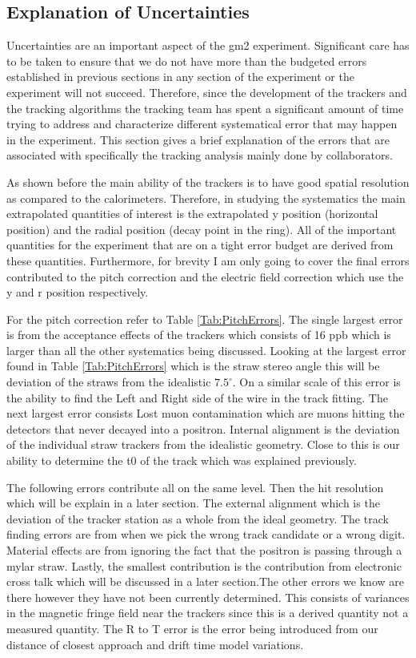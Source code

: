 \documentclass[./Thesis]{subfiles}
\begin{document}
\subsection{Explanation of Uncertainties}

Uncertainties are an important aspect of the gm2 experiment. Significant care has to be taken to ensure that we do not have more than the budgeted errors established in previous sections in any section of the experiment or the experiment will not succeed. Therefore, since the development of the trackers and the tracking algorithms the tracking team has spent a significant amount of time trying to address and characterize different systematical error that may happen in the experiment. This section gives a brief explanation of the errors that are associated with specifically the tracking analysis mainly done by collaborators.

As shown before the main ability of the trackers is to have good spatial resolution as compared to the calorimeters. Therefore, in studying the systematics the main extrapolated quantities of interest is the extrapolated y position (horizontal position) and the radial position (decay point in the ring). All of the important quantities for the experiment that are on a tight error budget are derived from these quantities. Furthermore, for brevity I am only going to cover the final errors contributed to the pitch correction and the electric field correction which use the y and r position respectively. 

	For the pitch correction refer to Table \ref{Tab:PitchErrors}. The single largest error is from the acceptance effects of the trackers which consists of 16 ppb which is larger than all the other systematics being discussed. Looking at the largest error found in Table \ref{Tab:PitchErrors} which is the straw stereo angle this will be deviation of the straws from the idealistic $7.5^\circ$. On a similar scale of this error is the ability to find the Left and Right side of the wire in the track fitting. The next largest error consists Lost muon contamination which are muons hitting the detectors that never decayed into a positron. Internal alignment is the deviation of the individual straw trackers from the idealistic geometry. Close to this is our ability to determine the t0 of the track which was explained previously. 

	 The following errors contribute all on the same level.  Then the hit resolution which will be explain in a later section. The external alignment which is the deviation of the tracker station as a whole from the ideal geometry. The track finding errors are from when we pick the wrong track candidate or a wrong digit. Material effects are from ignoring the fact that the positron is passing through a mylar straw. Lastly, the smallest contribution is the contribution from electronic cross talk which will be discussed in a later section.The other errors we know are there however they have not been currently determined. This consists of variances in the magnetic fringe field near the trackers since this is a derived quantity not a measured quantity. The R to T error is the error being introduced from our distance of closest approach and drift time model variations. \cite{jMottpitch}
	
\end{document}
